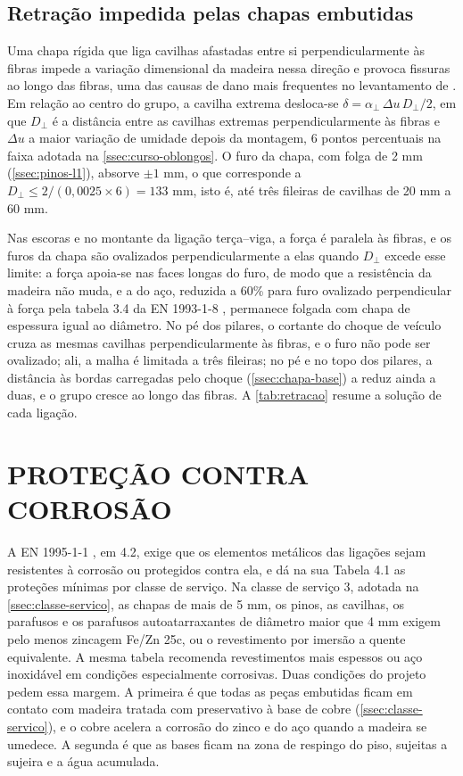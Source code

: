 \subsection{Retração impedida pelas chapas embutidas}\label{ssec:retracao-impedida}

Uma chapa rígida que liga cavilhas afastadas entre si perpendicularmente às fibras
impede a variação dimensional da madeira nessa direção e provoca fissuras ao
longo das fibras, uma das causas de dano mais frequentes no levantamento de
\textcite{dietsch:2018}. Em relação ao centro do grupo, a cavilha extrema
desloca-se $\delta = \alpha_\perp\,\Delta u\,D_\perp/2$, em que $D_\perp$ é a
distância entre as cavilhas extremas perpendicularmente às fibras e $\Delta u$ a
maior variação de umidade depois da montagem, 6 pontos percentuais na faixa
adotada na \autoref{ssec:curso-oblongos}. O furo da chapa, com folga de 2 mm
(\autoref{ssec:pinos-l1}), absorve $\pm 1$ mm, o que corresponde a
$D_\perp \leq 2/(0{,}0025 \times 6) = 133$ mm, isto é, até três fileiras de
cavilhas de 20 mm a 60 mm.

Nas escoras e no montante da ligação terça--viga, a força é paralela às fibras, e
os furos da chapa são ovalizados perpendicularmente a elas quando $D_\perp$
excede esse limite: a força apoia-se nas faces longas do furo, de modo que a
resistência da madeira não muda, e a do aço, reduzida a 60\% para furo
ovalizado perpendicular à força pela tabela 3.4 da EN 1993-1-8
\cite{EN1993-1-8:2005}, permanece folgada com chapa de espessura igual ao
diâmetro. No pé dos pilares, o cortante do choque de veículo cruza as mesmas
cavilhas perpendicularmente às fibras, e o furo não pode ser ovalizado; ali, a
malha é limitada a três fileiras; no pé e no topo dos pilares, a distância às bordas
carregadas pelo choque (\autoref{ssec:chapa-base}) a reduz ainda a duas, e o grupo
cresce ao longo das fibras. A
\autoref{tab:retracao} resume a solução de cada ligação.



\section{PROTEÇÃO CONTRA CORROSÃO}\label{sec:protecao-corrosao}

A EN 1995-1-1 \cite{EN1995-1-1:2004}, em 4.2, exige que os elementos metálicos
das ligações sejam resistentes à corrosão ou protegidos contra ela, e dá na sua
Tabela 4.1 as proteções mínimas por classe de serviço. Na classe de serviço 3,
adotada na \autoref{ssec:classe-servico}, as chapas de mais de 5 mm, os pinos, as
cavilhas, os parafusos e os parafusos autoatarraxantes de diâmetro maior que 4 mm
exigem pelo menos zincagem Fe/Zn 25c, ou o revestimento por imersão a quente
equivalente. A mesma tabela recomenda revestimentos mais espessos ou aço
inoxidável em condições especialmente corrosivas. Duas condições do projeto
pedem essa margem. A primeira é que todas as peças embutidas ficam em contato
com madeira tratada com preservativo à base de cobre
(\autoref{ssec:classe-servico}), e o cobre acelera a corrosão do zinco e do aço
quando a madeira se umedece. A segunda é que as bases ficam na zona de respingo
do piso, sujeitas a sujeira e a água acumulada.

